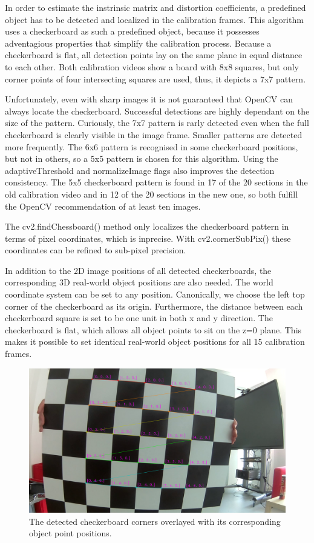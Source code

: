 \documentclass[bibliography=totoc]{scrartcl}
\begin{document}
In order to estimate the instrinsic matrix and distortion coefficients, a predefined object has to be detected and localized in the calibration frames.
This algorithm uses a checkerboard as such a predefined object, because it possesses adventagious properties that simplify the calibration process.
Because a checkerboard is flat, all detection points lay on the same plane in equal distance to each other.
Both calibration videos show a board with 8x8 squares, but only corner points of four intersecting squares are used, thus, it depicts a 7x7 pattern.

Unfortunately, even with sharp images it is not guaranteed that OpenCV can always locate the checkerboard.
Successful detections are highly dependant on the size of the pattern. 
Curiously, the 7x7 pattern is rarly detected even when the full checkerboard is clearly visible in the image frame.
Smaller patterns are detected more frequently.
The 6x6 pattern is recognised in some checkerboard positions, but not in others, so a 5x5 pattern is chosen for this algorithm.
Using the adaptiveThreshold and normalizeImage flags also improves the detection consistency.
The 5x5 checkerboard pattern is found in 17 of the 20 sections in the old calibration video and in 12 of the 20 sections in the new one, so both fulfill the OpenCV recommendation of at least ten images.

The cv2.findChessboard() method only localizes the checkerboard pattern in terms of pixel coordinates, which is inprecise.
With cv2.cornerSubPix() these coordinates can be refined to sub-pixel precision.

In addition to the 2D image positions of all detected checkerboards, the corresponding 3D real-world object positions are also needed.
The world coordinate system can be set to any position. 
Canonically, we choose the left top corner of the checkerboard as its origin.
Furthermore, the distance between each checkerboard square is set to be one unit in both x and y direction. 
The checkerboard is flat, which allows all object points to sit on the z=0 plane.
This makes it possible to set identical real-world object positions for all 15 calibration frames.

\begin{figure}[ht!]
	\centering
	\includegraphics[width=\linewidth]{imgs/labeled_checkerboard.png}
	\caption{The detected checkerboard corners overlayed with its corresponding object point positions.}
	\label{fig:labeled_checkerboard}
\end{figure}
\end{document}
